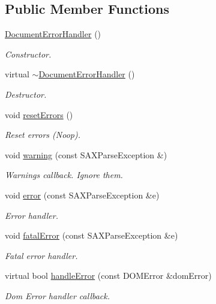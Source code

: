 \subsection*{Public Member Functions}
\begin{DoxyCompactItemize}
\item 
\hyperlink{class_d_d4hep_1_1_x_m_l_1_1_document_error_handler_aa887197fc5ae8d3a7463307a36dad8b2}{DocumentErrorHandler} ()
\begin{DoxyCompactList}\small\item\em Constructor. \item\end{DoxyCompactList}\item 
virtual \hyperlink{class_d_d4hep_1_1_x_m_l_1_1_document_error_handler_a2444e9636a7fe532b865aab9e7b3c676}{$\sim$DocumentErrorHandler} ()
\begin{DoxyCompactList}\small\item\em Destructor. \item\end{DoxyCompactList}\item 
void \hyperlink{class_d_d4hep_1_1_x_m_l_1_1_document_error_handler_aed02c6f154e651f714709b8448ba8fe4}{resetErrors} ()
\begin{DoxyCompactList}\small\item\em Reset errors (Noop). \item\end{DoxyCompactList}\item 
void \hyperlink{class_d_d4hep_1_1_x_m_l_1_1_document_error_handler_aea72a4df771def82a559fb89bee54489}{warning} (const SAXParseException \&)
\begin{DoxyCompactList}\small\item\em Warnings callback. Ignore them. \item\end{DoxyCompactList}\item 
void \hyperlink{class_d_d4hep_1_1_x_m_l_1_1_document_error_handler_a1a39025b14996aa817e9f42da6076d30}{error} (const SAXParseException \&e)
\begin{DoxyCompactList}\small\item\em Error handler. \item\end{DoxyCompactList}\item 
void \hyperlink{class_d_d4hep_1_1_x_m_l_1_1_document_error_handler_a2a765977361e8acb377a304c313bbcd3}{fatalError} (const SAXParseException \&e)
\begin{DoxyCompactList}\small\item\em Fatal error handler. \item\end{DoxyCompactList}\item 
virtual bool \hyperlink{class_d_d4hep_1_1_x_m_l_1_1_document_error_handler_a830b9a2a1ae3a2e35ae753b70ae18c52}{handleError} (const DOMError \&domError)
\begin{DoxyCompactList}\small\item\em Dom Error handler callback. \item\end{DoxyCompactList}\end{DoxyCompactItemize}


